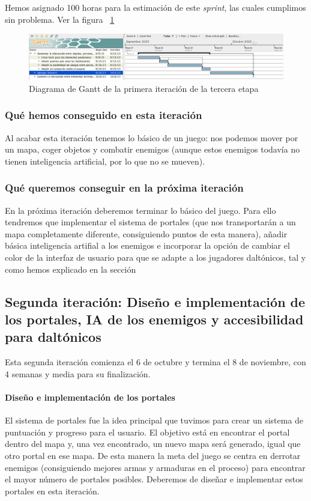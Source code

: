 Hemos asignado 100 horas para la estimación de este \textit{sprint}, las cuales cumplimos sin problema. Ver la figura ~\ref{fig:sec3it1}

\begin{figure}
    \includegraphics[width=\textwidth,height=\textheight,keepaspectratio]{./img/sec3it1.png}
  \caption{Diagrama de Gantt de la primera iteración de la tercera etapa}
  \label{fig:sec3it1}
\end{figure}

\subsubsection{Qué hemos conseguido en esta iteración}

Al acabar esta iteración tenemos lo básico de un juego: nos podemos mover por un mapa, coger objetos y combatir enemigos (aunque estos enemigos todavía no tienen inteligencia artificial, por lo que no se mueven).

\subsubsection{Qué queremos conseguir en la próxima iteración}

En la próxima iteración deberemos terminar lo básico del juego. Para ello tendremos que implementar el sistema de portales (que nos transportarán a un mapa completamente diferente, consiguiendo puntos de esta manera), añadir básica inteligencia artifial a los enemigos e incorporar la opción de cambiar el color de la interfaz de usuario para que se adapte a los jugadores daltónicos, tal y como hemos explicado en la sección \label{sec:daltonicossolventar}

\subsection{Segunda iteración: Diseño e implementación de los portales, IA de los enemigos y accesibilidad para daltónicos}

Esta segunda iteración comienza el 6 de octubre y termina el 8 de noviembre, con 4 semanas y media para su finalización.

\paragraph{Diseño e implementación de los portales} El sistema de portales fue la idea principal que tuvimos para crear un sistema de puntuación y progreso para el usuario. El objetivo está en encontrar el portal dentro del mapa y, una vez encontrado, un nuevo mapa será generado, igual que otro portal en ese mapa. De esta manera la meta del juego se centra en derrotar enemigos (consiguiendo mejores armas y armaduras en el proceso) para encontrar el mayor número de portales posibles.
Deberemos de diseñar e implementar estos portales en esta iteración.

